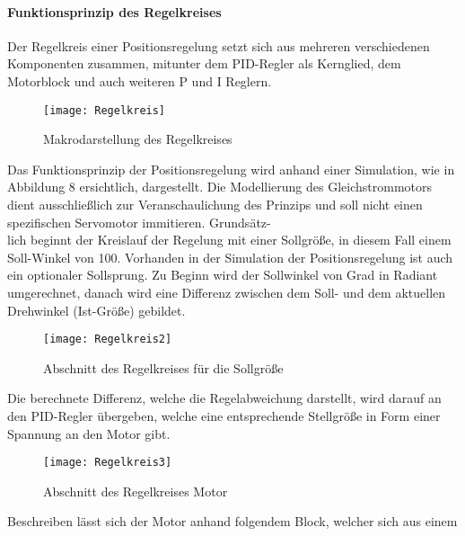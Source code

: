 \documentclass[titlepage,12pt,twoside]{article}
\begin{document}
\paragraph{Funktionsprinzip des Regelkreises}
\hfill \break
\hfill \break
Der Regelkreis einer Positionsregelung setzt sich aus mehreren verschiedenen 
Komponenten zusammen, mitunter dem PID-Regler als Kernglied, dem Motorblock und 
auch weiteren P und I Reglern. \\
\begin{figure}[H]
	\begin{center}
		\scalebox{1.2}
		{\texttt{[image: Regelkreis]}}
		\caption{Makrodarstellung des Regelkreises}
		\label{fig:Regelkreis}
	\end{center}
\end{figure}
\hfill \break
Das Funktionsprinzip der Positionsregelung wird anhand einer Simulation, wie in Abbildung 8 ersichtlich, dargestellt. Die Modellierung des Gleichstrommotors dient ausschließlich zur Veranschaulichung des Prinzips und soll nicht einen spezifischen Servomotor immitieren.
Grundsätz-\\lich beginnt der Kreislauf der Regelung mit einer Sollgröße, in diesem Fall 
einem Soll-Winkel von 100\textdegree. Vorhanden in der Simulation der Positionsregelung ist auch 
ein optionaler Sollsprung. Zu Beginn wird der Sollwinkel von Grad in Radiant 
umgerechnet, danach wird eine Differenz zwischen dem Soll- und dem aktuellen 
Drehwinkel (Ist-Größe) gebildet. \\
\begin{figure}[H]
	\begin{center}
		\scalebox{1}
		{\texttt{[image: Regelkreis2]}}
		\caption{Abschnitt des Regelkreises für die Sollgröße}
		\label{fig:Regelkreis2}
	\end{center}
\end{figure}
\hfill \break
Die berechnete Differenz, welche die Regelabweichung darstellt, wird darauf an den 
PID-Regler übergeben, welche eine entsprechende Stellgröße in Form einer Spannung an 
den Motor gibt. \\
\begin{figure}[H]
	\begin{center}
		\scalebox{1}
		{\texttt{[image: Regelkreis3]}}
		\caption{Abschnitt des Regelkreises Motor}
		\label{fig:Regelkreis3}
	\end{center}
\end{figure}
\hfill \break
Beschreiben lässt sich der Motor anhand folgendem Block, welcher sich aus einem 
\end{document}
